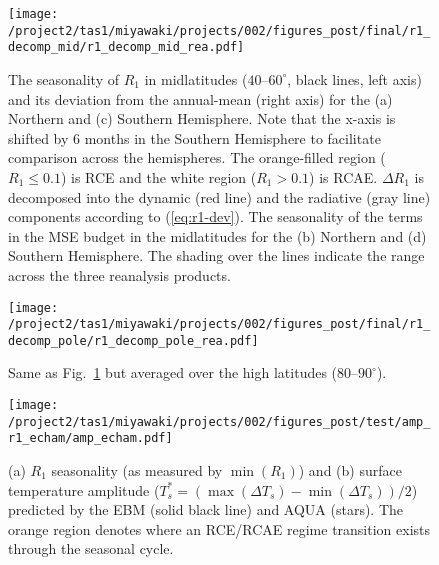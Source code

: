 \documentclass{ametsocV5}
\begin{document}
\begin{figure}[t]
  \noindent\texttt{[image: /project2/tas1/miyawaki/projects/002/figures\_post/final/r1\_decomp\_mid/r1\_decomp\_mid\_rea.pdf]}\\
  \caption{The seasonality of $R_{1}$ in midlatitudes ($40$--$60^{\circ}$, black lines, left axis) and its deviation from the annual-mean (right axis) for the (a) Northern and (c) Southern Hemisphere. Note that the x-axis is shifted by 6 months in the Southern Hemisphere to facilitate comparison across the hemispheres. The orange-filled region ($R_1 \le 0.1$) is RCE and the white region ($R_1>0.1$) is RCAE. $\Delta R_1$ is decomposed into the dynamic (red line) and the radiative (gray line) components according to (\ref{eq:r1-dev}). The seasonality of the terms in the MSE budget in the midlatitudes for the (b) Northern and (d) Southern Hemisphere. The shading over the lines indicate the range across the three reanalysis products.}
  \label{fig:rea-r1-decomp-mid}
\end{figure}

\begin{figure}[t]
  \noindent\texttt{[image: /project2/tas1/miyawaki/projects/002/figures\_post/final/r1\_decomp\_pole/r1\_decomp\_pole\_rea.pdf]}\\
  \caption{Same as Fig.~\ref{fig:rea-r1-decomp-mid} but averaged over the high latitudes ($80$--$90^{\circ}$).}
  \label{fig:rea-r1-decomp-pole}
\end{figure}

\begin{figure}
  \noindent\texttt{[image: /project2/tas1/miyawaki/projects/002/figures\_post/test/amp\_r1\_echam/amp\_echam.pdf]}\\
  \caption{(a) $R_1$ seasonality (as measured by $\min(R_1)$) and (b) surface temperature amplitude ($T_s^*=(\max(\Delta T_s)- \min(\Delta T_s))/2$) predicted by the EBM (solid black line) and AQUA (stars). The orange region denotes where an RCE/RCAE regime transition exists through the seasonal cycle.}
  \label{fig:amp-r1-echam}
\end{figure}
\end{document}
